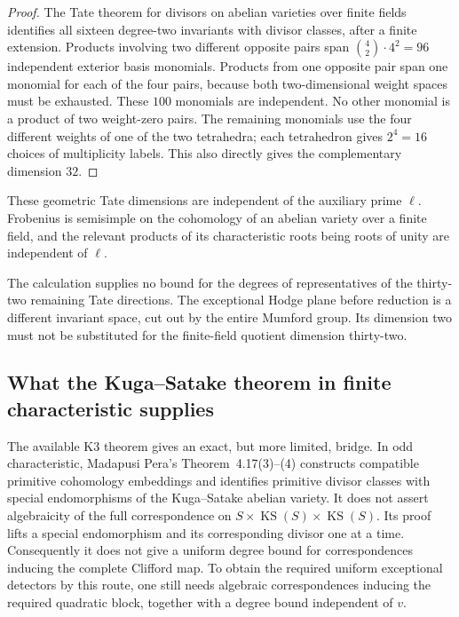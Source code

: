 \documentclass[11pt]{article}
\theoremstyle{definition}
\theoremstyle{remark}
\begin{document}
\begin{proof}
The Tate theorem for divisors on abelian varieties over finite fields
\cite[Main Theorem, p.~134]{TateFiniteFields} identifies all sixteen degree-two
invariants with divisor classes, after a finite extension.
Products involving two different opposite pairs span
$\binom42\cdot4^2=96$ independent exterior basis monomials.
Products from one opposite pair span one monomial for each of the four
pairs, because both two-dimensional weight spaces must be exhausted.
These $100$ monomials are independent.  No other monomial is a product
of two weight-zero pairs.  The remaining monomials use the four
different weights of one of the two tetrahedra; each tetrahedron gives
$2^4=16$ choices of multiplicity labels.  This also directly gives
the complementary dimension $32$.
\end{proof}

These geometric Tate dimensions are independent of the auxiliary
prime $\ell$. Frobenius is semisimple on the cohomology of an
abelian variety over a finite field, and the relevant products of
its characteristic roots being roots of unity are independent of
$\ell$.

The calculation supplies no bound for the degrees of representatives of
the thirty-two remaining Tate directions.  The exceptional Hodge plane
before reduction is a different invariant space, cut out by the entire
Mumford group.  Its dimension two must not be substituted for the
finite-field quotient dimension thirty-two.

\subsection{What the Kuga--Satake theorem in finite characteristic supplies}

The available K3 theorem gives an exact, but more limited, bridge.
In odd characteristic, Madapusi Pera's Theorem~4.17(3)--(4)
\cite[pp.~22--23]{MadapusiPeraK3} constructs compatible primitive
cohomology embeddings and identifies primitive divisor classes with
special endomorphisms of the Kuga--Satake abelian variety.
It does not assert algebraicity of the full correspondence on
$S\times\operatorname{KS}(S)\times\operatorname{KS}(S)$.
Its proof lifts a special endomorphism and its corresponding divisor
one at a time.  Consequently it does not give a uniform degree bound
for correspondences inducing the complete Clifford map.
To obtain the required uniform exceptional detectors by this route,
one still needs algebraic correspondences inducing the required
quadratic block, together with a degree bound independent of $v$.
\end{document}
